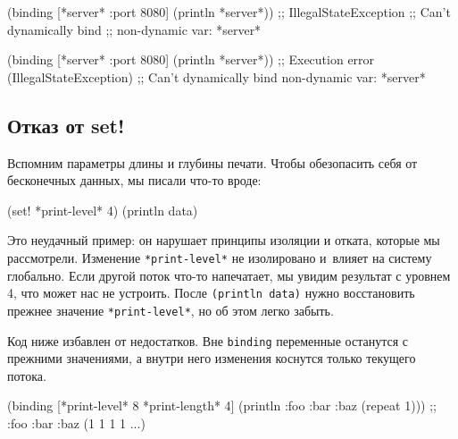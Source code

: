 \ifnarrow

\begin{english}
  \begin{clojure}
(binding [*server* {:port 8080}]
  (println *server*))
;; IllegalStateException
;; Can't dynamically bind
;; non-dynamic var: *server*
  \end{clojure}
\end{english}

\else

\begin{english}
  \begin{clojure}
(binding [*server* {:port 8080}]
  (println *server*))
;; Execution error (IllegalStateException)
;; Can't dynamically bind non-dynamic var: *server*
  \end{clojure}
\end{english}

\fi

\subsection{Отказ от set!}

Вспомним параметры длины и глубины печати. Чтобы обезопасить себя от бесконечных
данных, мы писали что-то вроде:

\begin{english}
  \begin{clojure}
(set! *print-level* 4)
(println data)
  \end{clojure}
\end{english}


Это неудачный пример: он нарушает принципы изоляции и отката, которые мы
рассмотрели. Изменение \verb|*print-level*| не изолировано и~влияет на систему
глобально. Если другой поток что-то напечатает, мы увидим результат с уровнем 4,
что может нас не устроить. После \verb|(println data)| нужно восстановить
прежнее значение \verb|*print-level*|, но об этом легко забыть.

Код ниже избавлен от недостатков. Вне \texttt{bin\-ding} переменные останутся с
прежними значениями, а внутри него изменения коснутся только текущего потока.

\ifnarrow

\begin{english}
  \begin{clojure}
(binding [*print-level* 8
          *print-length* 4]
  (println
    {:foo {:bar {:baz (repeat 1)}}}))
;; {:foo {:bar {:baz (1 1 1 1 ...)}}}
  \end{clojure}
\end{english}

